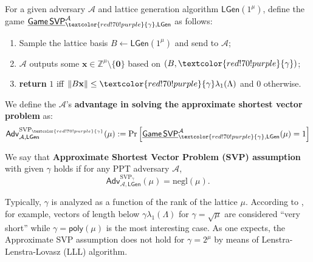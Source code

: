 \documentclass{template}
\begin{document}
\begin{definition}\label{def:appr-svp}
    For a given adversary $\mathcal{A}$ and lattice generation algorithm
    $\mathsf{LGen}(1^{\mu})$, define the game
    $\underline{\mathsf{Game}\,\mathsf{SVP}}^{\mathcal{A}}_{\textcolor{red!70!purple}{\gamma},\mathsf{LGen}}$ as follows:
    \begin{enumerate}
        \item Sample the lattice basis $B \gets \mathsf{LGen}(1^{\mu})$ and send to $\mathcal{A}$;
        \item $\mathcal{A}$ outputs some $\mathbf{x} \in \mathbb{Z}^{\mu} \setminus \{\mathbf{0}\}$ based on $(B,\textcolor{red!70!purple}{\gamma})$;
        \item \textbf{return} $1$ iff $\|B\mathbf{x}\| \leq \textcolor{red!70!purple}{\gamma}\lambda_1(\Lambda)$ and $0$ otherwise.
    \end{enumerate}
    We define the $\mathcal{A}$'s \textbf{advantage in solving the approximate
    shortest vector problem} as:
    \begin{equation*}
        \mathsf{Adv}^{\text{SVP}_{\textcolor{red!70!purple}{\gamma}}}_{\mathcal{A},\mathsf{LGen}}(\mu) := \text{Pr}\left[\underline{\mathsf{Game}\,\mathsf{SVP}}^{\mathcal{A}}_{\textcolor{red!70!purple}{\gamma},\mathsf{LGen}}(\mu) = 1\right]
    \end{equation*} 
\end{definition}

\begin{definition}\label{def:approximate-svp-assumption}
    We say that \textbf{Approximate Shortest Vector Problem (SVP) assumption}
    with given $\gamma$ holds if for any PPT adversary $\mathcal{A}$,
    \begin{equation*}
        \mathsf{Adv}^{\text{SVP}_{\gamma}}_{\mathcal{A},\mathsf{LGen}}(\mu) = \text{negl}(\mu).
    \end{equation*}
\end{definition}

Typically, $\gamma$ is analyzed as a function of the rank of the lattice $\mu$.
According to \cite[Section 2.2.5]{nist}, for example, vectors of length below
$\gamma\lambda_1(\Lambda)$ for $\gamma = \sqrt{\mu}$ are considered ``very short''
while $\gamma = \mathsf{poly}(\mu)$ is the most interesting case. As one
expects, the Approximate SVP assumption does not hold for $\gamma=2^{\mu}$ by
means of Lenstra-Lenstra-Lovasz (LLL) algorithm.
\end{document}

